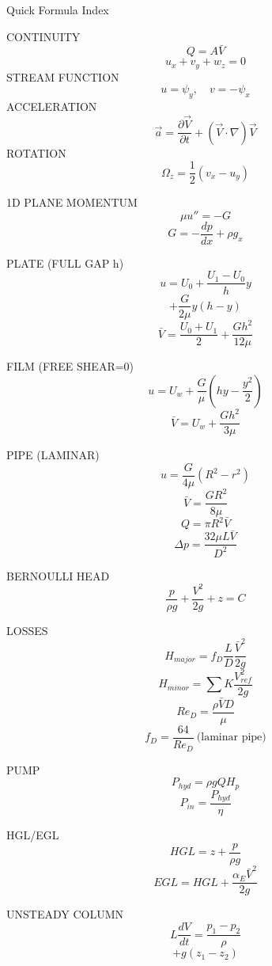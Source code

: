Quick Formula Index

CONTINUITY
$$Q=A\bar V$$
$$u_x+v_y+w_z=0$$
STREAM FUNCTION
$$u=\psi_y,\quad v=-\psi_x$$
ACCELERATION
$$\vec a=\frac{\partial\vec V}{\partial t}+(\vec V\cdot\nabla)\vec V$$
ROTATION
$$\Omega_z=\frac{1}{2}(v_x-u_y)$$

1D PLANE MOMENTUM
$$\mu u''=-G$$
$$G=-\frac{dp}{dx}+\rho g_x$$

PLATE (FULL GAP h)
$$u=U_0+\frac{U_1-U_0}{h}y$$
$$+\frac{G}{2\mu}y(h-y)$$
$$\bar V=\frac{U_0+U_1}{2}+\frac{Gh^2}{12\mu}$$

FILM (FREE SHEAR=0)
$$u=U_w+\frac{G}{\mu}(hy-\frac{y^2}{2})$$
$$\bar V=U_w+\frac{Gh^2}{3\mu}$$

PIPE (LAMINAR)
$$u=\frac{G}{4\mu}(R^2-r^2)$$
$$\bar V=\frac{GR^2}{8\mu}$$
$$Q=\pi R^2\bar V$$
$$\Delta p=\frac{32\mu L\bar V}{D^2}$$

BERNOULLI HEAD
$$\frac{p}{\rho g}+\frac{V^2}{2g}+z=C$$

LOSSES
$$H_{major}=f_D\frac{L}{D}\frac{\bar V^2}{2g}$$
$$H_{minor}=\sum K\frac{V_{ref}^2}{2g}$$
$$Re_D=\frac{\rho\bar VD}{\mu}$$
$$f_D=\frac{64}{Re_D}\ \text{(laminar pipe)}$$

PUMP
$$P_{hyd}=\rho gQH_p$$
$$P_{in}=\frac{P_{hyd}}{\eta}$$

HGL/EGL
$$HGL=z+\frac{p}{\rho g}$$
$$EGL=HGL+\frac{\alpha_E\bar V^2}{2g}$$

UNSTEADY COLUMN
$$L\frac{dV}{dt}=\frac{p_1-p_2}{\rho}$$
$$+g(z_1-z_2)$$
